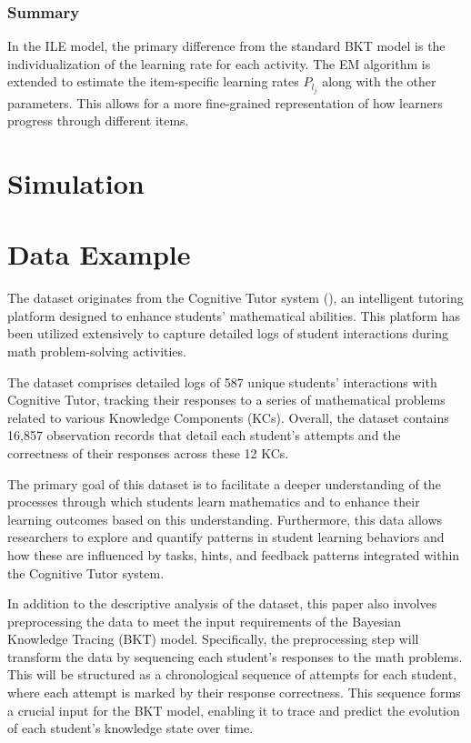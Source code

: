 \documentclass{article}
\begin{document}
\subsubsection{Summary}
In the ILE model, the primary difference from the standard BKT model is the individualization of the learning rate for each activity. The EM algorithm is extended to estimate the item-specific learning rates \(P_{l_j}\) along with the other parameters. This allows for a more fine-grained representation of how learners progress through different items.

\section{Simulation}

% 

\section{Data Example}

The dataset originates from the Cognitive Tutor system (\cite{ritter2007cognitive}), an intelligent tutoring platform designed to enhance students' mathematical abilities. This platform has been utilized extensively to capture detailed logs of student interactions during math problem-solving activities.

The dataset comprises detailed logs of 587 unique students' interactions with Cognitive Tutor, tracking their responses to a series of mathematical problems related to various Knowledge Components (KCs). Overall, the dataset contains 16,857 observation records that detail each student's attempts and the correctness of their responses across these 12 KCs.

The primary goal of this dataset is to facilitate a deeper understanding of the processes through which students learn mathematics and to enhance their learning outcomes based on this understanding. Furthermore, this data allows researchers to explore and quantify patterns in student learning behaviors and how these are influenced by tasks, hints, and feedback patterns integrated within the Cognitive Tutor system.

In addition to the descriptive analysis of the dataset, this paper also involves preprocessing the data to meet the input requirements of the Bayesian Knowledge Tracing (BKT) model. Specifically, the preprocessing step will transform the data by sequencing each student's responses to the math problems. This will be structured as a chronological sequence of attempts for each student, where each attempt is marked by their response correctness. This sequence forms a crucial input for the BKT model, enabling it to trace and predict the evolution of each student's knowledge state over time.
\end{document}
